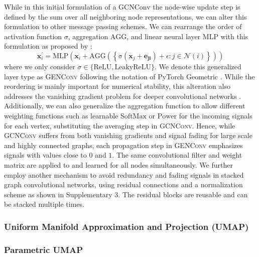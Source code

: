 \documentclass[]{article}
\renewcommand{\cite}{\citep}
\begin{document}
While in this initial formulation of a GCNConv the node-wise update
step is defined by the sum over all neighboring node representations,
we can alter this formulation to other message passing schemes.  We
can rearrange the order of activation function $\sigma$, aggregation
$\mathrm{AGG}$, and linear neural layer $\mathrm{MLP}$ with this
formulation as proposed by \cite{GENConv2020}:
\begin{equation}
	\mathbf{x}_i^{\prime} = \mathrm{MLP} \left( \mathbf{x}_i +
	\mathrm{AGG} \left( \left\{
	\mathrm{\sigma} \left( \mathbf{x}_j + \mathbf{e_{ji}} \right) +\epsilon
	: j \in \mathcal{N}(i) \right\} \right)
	\right)
\end{equation}
where we only consider
$\sigma \in \{\mathrm{ReLU}, \mathrm{LeakyReLU}\}$. We denote this
generalized layer type as \textsc{GENConv} following the notation of
PyTorch Geometric \cite{PytorchGeometric}.  While the reordering is
mainly important for numerical stability, this alteration also addresses
the vanishing gradient problem for deeper convolutional networks
\cite{GENConv2020}. Additionally, we can also generalize the
aggregation function to allow different weighting functions such as
learnable $\mathrm{SoftMax}$ or $\mathrm{Power}$ for the incoming
signals for each vertex, substituting the averaging step in
\textsc{GCNConv}. Hence, while \textsc{GCNConv} suffers from both
vanishing gradients and signal fading for large scale and highly
connected graphs, each propagation step in \textsc{GENConv} emphasizes
signals with values close to $0$ and $1$. The same convolutional
filter and weight matrix are applied to and learned for all nodes
simultaneously. %
We further employ another mechanism to avoid redundancy and fading
signals in stacked graph convolutional networks, using residual
connections and a normalization scheme \cite{DeepGCN2019}
	\cite{GENConv2020} as shown in Supplementary 3.  The residual
blocks are reusable and can be stacked multiple times.

\subsubsection{Uniform Manifold Approximation and Projection (UMAP)}

\subsubsection{Parametric UMAP}
\end{document}
